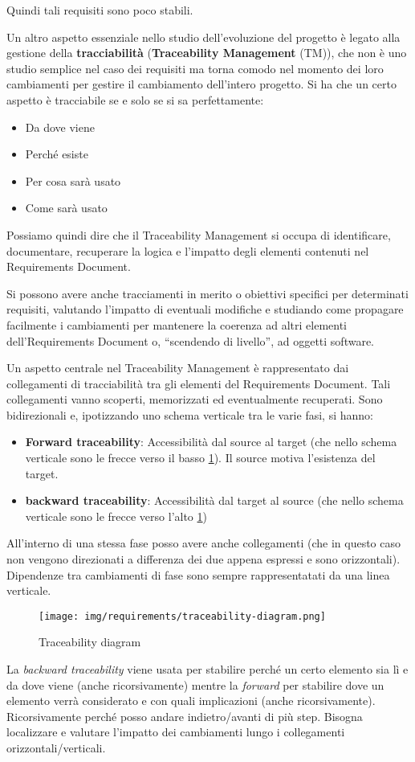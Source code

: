 Quindi tali requisiti sono poco stabili.

Un altro aspetto essenziale nello studio dell'evoluzione del progetto è legato
alla gestione della \textbf{tracciabilità} (\textbf{Traceability Management}
(TM)), che non è uno studio semplice nel caso dei requisiti ma torna comodo nel
momento dei loro cambiamenti per gestire il cambiamento dell'intero progetto. Si
ha che un certo aspetto è tracciabile se e solo se si sa perfettamente:
\begin{itemize}
      \item Da dove viene
      \item Perché esiste
      \item Per cosa sarà usato
      \item Come sarà usato
\end{itemize}
Possiamo quindi dire che il Traceability Management si occupa di identificare,
documentare, recuperare la logica e l'impatto degli elementi contenuti nel
Requirements Document.

Si possono avere anche tracciamenti in merito o obiettivi specifici per determinati
requisiti, valutando l'impatto di eventuali modifiche e studiando come propagare
facilmente i cambiamenti per mantenere la coerenza ad altri elementi
dell'Requirements Document o, “scendendo di livello”, ad oggetti software.

Un aspetto centrale nel Traceability Management è rappresentato dai collegamenti
di tracciabilità tra gli elementi del Requirements Document. Tali collegamenti
vanno scoperti, memorizzati ed eventualmente recuperati. Sono bidirezionali e,
ipotizzando uno schema verticale tra le varie fasi, si hanno:
\begin{itemize}
      \item \textbf{Forward traceability}: Accessibilità dal source al target
            (che nello schema verticale sono le frecce verso il basso
            \ref{fig:traceability-diagram}). Il source motiva l'esistenza del
            target.
      \item \textbf{backward traceability}: Accessibilità dal target al source
            (che nello schema verticale sono le frecce verso l'alto
            \ref{fig:traceability-diagram})
\end{itemize}
All'interno di una stessa fase posso avere anche collegamenti (che in questo caso
non vengono direzionati a differenza dei due appena espressi e sono orizzontali).
Dipendenze tra cambiamenti di fase sono sempre rappresentatati da una linea verticale.
\begin{figure}[!ht]
      \centering
      \texttt{[image: img/requirements/traceability-diagram.png]}
      \caption{Traceability diagram}
      \label{fig:traceability-diagram}
\end{figure}
La \textit{backward traceability} viene usata per stabilire perché un certo
elemento sia lì e da dove viene (anche ricorsivamente) mentre la \textit{forward}
per stabilire dove un elemento verrà considerato e con quali implicazioni
(anche ricorsivamente). Ricorsivamente perché posso andare indietro/avanti di
più step. Bisogna localizzare e valutare l'impatto dei cambiamenti lungo i
collegamenti orizzontali/verticali.

